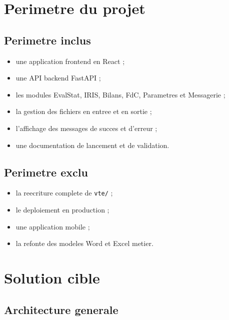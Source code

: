 \documentclass[11pt,a4paper]{report}
\begin{document}
\chapter{Perimetre du projet}

\section{Perimetre inclus}
\begin{itemize}
  \item une application frontend en React ;
  \item une API backend FastAPI ;
  \item les modules EvalStat, IRIS, Bilans, FdC, Parametres et Messagerie ;
  \item la gestion des fichiers en entree et en sortie ;
  \item l'affichage des messages de succes et d'erreur ;
  \item une documentation de lancement et de validation.
\end{itemize}

\section{Perimetre exclu}
\begin{itemize}
  \item la reecriture complete de \texttt{vte/} ;
  \item le deploiement en production ;
  \item une application mobile ;
  \item la refonte des modeles Word et Excel metier.
\end{itemize}

\chapter{Solution cible}

\section{Architecture generale}
\begin{center}
\end{center}
\end{document}
